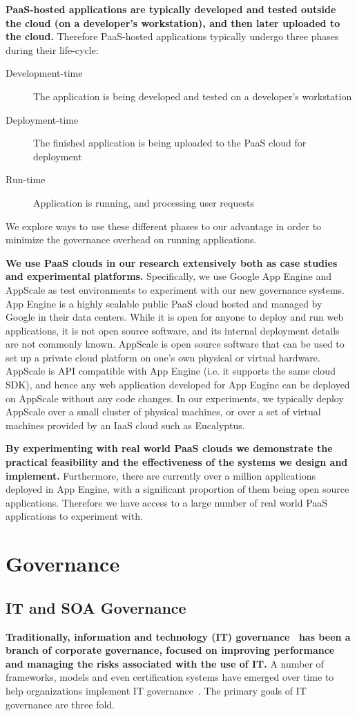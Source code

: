 \textbf{PaaS-hosted applications are typically developed and tested outside the cloud (on a developer's workstation), 
and then later uploaded to the cloud.} Therefore PaaS-hosted applications typically undergo three phases 
during their life-cycle:
\begin{description}
\item[Development-time] The application is being developed and tested on a developer's workstation
\item[Deployment-time] The finished application is being uploaded to the PaaS cloud for deployment
\item[Run-time] Application is running, and processing user requests
\end{description}
We explore ways to use these different phases to our advantage in order to minimize the governance
overhead on running applications. 

\textbf{We use PaaS clouds in our research extensively both as case studies
and experimental platforms.} Specifically, we use Google App Engine and AppScale as test environments
to experiment with our new governance systems. App Engine is a highly scalable public PaaS cloud hosted and
managed by Google in their data centers. While it is open for anyone to deploy and run web applications, it is not
open source software, and its internal deployment details are not commonly known. AppScale is open source
software that can be used to set up a private cloud platform on one's own physical or virtual hardware. AppScale
is API compatible with App Engine (i.e. it supports the same cloud SDK), and hence any web application developed
for App Engine can be deployed on AppScale without any code changes. In our experiments, we typically deploy
AppScale over a small cluster of physical machines, or over a set of virtual machines provided by an IaaS cloud
such as Eucalyptus.

\textbf{By experimenting with real world PaaS clouds we demonstrate the practical feasibility and the effectiveness of 
the systems we design and implement.} Furthermore, there are currently over a million applications deployed
in App Engine, with a significant proportion of them being open source applications. Therefore we have access
to a large number of real world PaaS applications to experiment with.

\section{Governance}
\subsection{IT and SOA Governance}
\textbf{Traditionally, information and technology (IT) governance~\cite{brown2005framing} has been a branch of 
corporate governance, focused on improving performance and managing the risks associated with the use of IT.} 
A number of frameworks, models and even certification systems have emerged over time to help organizations 
implement IT governance~\cite{Ataya:2013:ISR:2523514.2523590,gov-cert}. 
The primary goals of IT governance are three fold.

